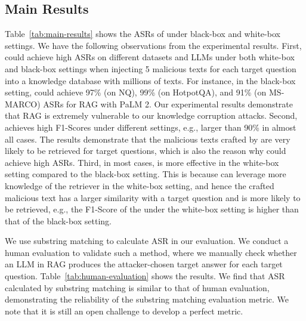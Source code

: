                    









\subsection{Main Results}
\vspace{-1mm}
Table~\ref{tab:main-results} shows the ASRs of {\name} under black-box and white-box settings. We have the following observations from the experimental results. First, {\name} could achieve high ASRs on different datasets and LLMs under both white-box and black-box settings when injecting 5 malicious texts for each target question into a knowledge database with millions of texts. For instance, in the black-box setting, {\name} could achieve 97\% (on NQ), 99\% (on HotpotQA), and 91\% (on MS-MARCO) ASRs for RAG with PaLM 2.
Our experimental results demonstrate that RAG is extremely vulnerable to our knowledge corruption attacks. 
Second, {\name} achieves high F1-Scores under different settings, e.g., larger than 90\% in almost all cases. The results demonstrate that the malicious texts crafted by {\name} are very likely to be retrieved for target questions, which is also the reason why {\name} could achieve high ASRs.
Third, in most cases, {\name} is more effective in the white-box setting compared to the black-box setting. 
This is because {\name} can leverage more knowledge of the retriever in the white-box setting, and hence the crafted malicious text has a larger similarity with a target question and is more likely to be retrieved, e.g., the F1-Score of the {\name} under the white-box setting is higher than that of the black-box setting.


We use substring matching to calculate ASR in our evaluation. We conduct a human evaluation to validate such a method, where we manually check whether an LLM in RAG produces the attacker-chosen target answer for each target question. Table~\ref{tab:human-evaluation} shows the results. We find that ASR calculated by substring matching is similar to that of human evaluation, demonstrating the reliability of the substring matching evaluation metric. We note that it is still an open challenge to develop a perfect metric.






